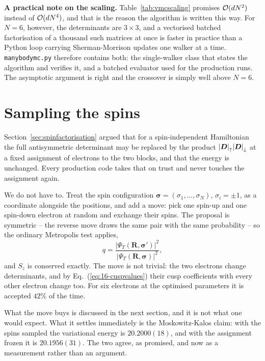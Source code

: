 \begin{notebox}
\textbf{A practical note on the scaling.}  Table~\ref{tab:vmcscaling} promises
$\mathcal{O}(dN^2)$ instead of $\mathcal{O}(dN^4)$, and that is the reason the algorithm is
written this way.  For $N=6$, however, the determinants are $3\times3$, and a
vectorised batched factorisation of a thousand such matrices at once is faster
in practice than a Python loop carrying Sherman-Morrison updates one walker at
a time.  \texttt{manybodymc.py} therefore contains both: the single-walker
class that states the algorithm and verifies it, and a batched evaluator used
for the production runs.  The asymptotic argument is right and the crossover is
simply well above $N=6$.
\end{notebox}

\section{Sampling the spins}
\label{sec:appspin}

Section~\ref{sec:spinfactorisation} argued that for a spin-independent
Hamiltonian the full antisymmetric determinant may be replaced by the product
${|\boldsymbol{D}|}_{\uparrow}{|\boldsymbol{D}|}_{\downarrow}$ at a fixed assignment of electrons to
the two blocks, and that the energy is unchanged.  Every production code takes
that on trust and never touches the assignment again.

We do not have to.  Treat the spin configuration
$\bm{\sigma}=(\sigma_1,\dots,\sigma_N)$, $\sigma_i=\pm1$, as a coordinate
alongside the positions, and add a move: pick one spin-up and one spin-down
electron at random and exchange their spins.  The proposal is symmetric -- the
reverse move draws the same pair with the same probability -- so the ordinary
Metropolis test applies,
\begin{equation}
  q = \frac{\left|\Psi_T(\bm{R},\bm{\sigma}')\right|^2}
           {\left|\Psi_T(\bm{R},\bm{\sigma})\right|^2} ,
  \label{eq:16-spinmetropolis}
\end{equation}
and $S_z$ is conserved exactly.  The move is not trivial: the two electrons
change determinants, and by Eq.~(\ref{eq:16-cuspvalues}) their cusp
coefficients with every other electron change too.  For six electrons at the
optimised parameters it is accepted $42\%$ of the time.

What the move buys is discussed in the next section, and it is not what one
would expect.  What it settles immediately is the Moskowitz-Kalos claim: with
the spins sampled the variational energy is $20.2000(18)$, and with the
assignment frozen it is $20.1956(31)$.  The two agree, as promised, and now as
a measurement rather than an argument.

